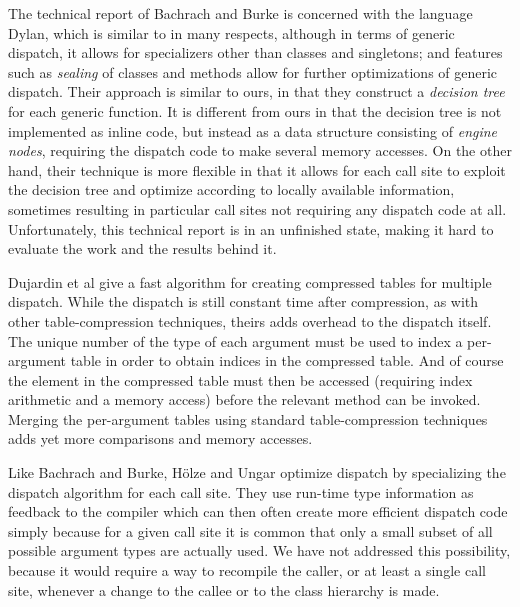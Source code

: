 The technical report of Bachrach and Burke \cite{Bachrach:2000} is
concerned with the language Dylan, which is similar to \cl{} in many
respects, although in terms of generic dispatch, it allows for
specializers other than classes and singletons; and features such as
\emph{sealing} of classes and methods allow for further optimizations
of generic dispatch.  Their approach is similar to ours, in that they
construct a \emph{decision tree} for each generic function.  It is
different from ours in that the decision tree is not implemented as
inline code, but instead as a data structure consisting of
\emph{engine nodes}, requiring the dispatch code to make several
memory accesses.  On the other hand, their technique is more flexible
in that it allows for each call site to exploit the decision tree and
optimize according to locally available information, sometimes
resulting in particular call sites not requiring any dispatch code at
all.  Unfortunately, this technical report is in an unfinished state,
making it hard to evaluate the work and the results behind it.

Dujardin et al \cite{Dujardin:1998:FAC:271510.271521} give a fast
algorithm for creating compressed tables for multiple dispatch.  While
the dispatch is still constant time after compression, as with other
table-compression techniques, theirs adds overhead to the dispatch
itself.  The unique number of the type of each argument must be used
to index a per-argument table in order to obtain indices in the
compressed table.  And of course the element in the compressed table
must then be accessed (requiring index arithmetic and a memory access)
before the relevant method can be invoked.  Merging the per-argument
tables using standard table-compression techniques adds yet more
comparisons and memory accesses. 

Like Bachrach and Burke, Hölze and Ungar
\cite{Holzle:1994:ODC:178243.178478} optimize dispatch by specializing
the dispatch algorithm for each call site.  They use run-time type
information as feedback to the compiler which can then often create
more efficient dispatch code simply because for a given call site it
is common that only a small subset of all possible argument types are
actually used.  We have not addressed this possibility, because it
would require a way to recompile the caller, or at least a single call
site, whenever a change to the callee or to the class hierarchy is
made.  
